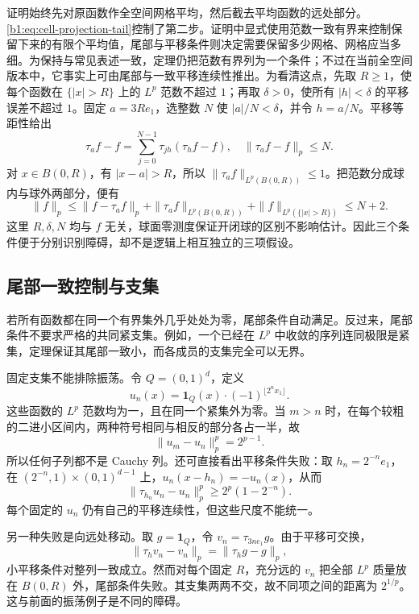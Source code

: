 证明始终先对原函数作全空间网格平均，然后截去平均函数的远处部分。\eqref{b1:eq:cell-projection-tail}控制了第二步。证明中显式使用范数一致有界来控制保留下来的有限个平均值，尾部与平移条件则决定需要保留多少网格、网格应当多细。为保持与常见表述一致，定理仍把范数有界列为一个条件；不过在当前全空间版本中，它事实上可由尾部与一致平移连续性推出。为看清这点，先取 \(R\ge1\)，使每个函数在 \(\{|x|>R\}\) 上的 \(L^p\) 范数不超过 \(1\)；再取 \(\delta>0\)，使所有 \(|h|<\delta\) 的平移误差不超过 \(1\)。固定 \(a=3Re_1\)，选整数 \(N\) 使 \(|a|/N<\delta\)，并令 \(h=a/N\)。平移等距性给出
\[
 \tau_af-f=\sum_{j=0}^{N-1}\tau_{jh}(\tau_hf-f),\quad
 \|\tau_af-f\|_p\le N.
\]
对 \(x\in B(0,R)\)，有 \(|x-a|>R\)，所以 \(\|\tau_af\|_{L^p(B(0,R))}\le1\)。把范数分成球内与球外两部分，便有
\[
 \|f\|_p\le\|f-\tau_af\|_p+\|\tau_af\|_{L^p(B(0,R))}
       +\|f\|_{L^p(\{|x|>R\})}\le N+2.
\]
这里 \(R,\delta,N\) 均与 \(f\) 无关，球面零测度保证开闭球的区别不影响估计。因此三个条件便于分别识别障碍，却不是逻辑上相互独立的三项假设。

\subsection{尾部一致控制与支集}
\label{b1:subsec:250103}

若所有函数都在同一个有界集外几乎处处为零，尾部条件自动满足。反过来，尾部条件不要求严格的共同紧支集。例如，一个已经在 \(L^p\) 中收敛的序列连同极限是紧集，定理保证其尾部一致小，而各成员的支集完全可以无界。

\ProseParagraphBreak

固定支集不能排除振荡。令 \(Q=(0,1)^d\)，定义
\[
 u_n(x)=\mathbf1_Q(x)\cdot(-1)^{\lfloor2^n x_1\rfloor}.
\]
这些函数的 \(L^p\) 范数均为一，且在同一个紧集外为零。当 \(m>n\) 时，在每个较粗的二进小区间内，两种符号相同与相反的部分各占一半，故
\[
 \|u_m-u_n\|_p^p=2^{p-1}.
\]
所以任何子列都不是 Cauchy 列。还可直接看出平移条件失败：取
\(h_n=2^{-n}e_1\)，在
\((2^{-n},1)\times(0,1)^{d-1}\) 上，\(u_n(x-h_n)=-u_n(x)\)，从而
\[
 \|\tau_{h_n}u_n-u_n\|_p^p
 \geq2^p(1-2^{-n}).
\]
每个固定的 \(u_n\) 仍有自己的平移连续性，但这些尺度不能统一。

\ProseParagraphBreak

另一种失败是向远处移动。取 \(g=\mathbf1_Q\)，令
\(v_n=\tau_{3ne_1}g\)。由于平移可交换，
\[
 \|\tau_hv_n-v_n\|_p=\|\tau_hg-g\|_p,
\]
小平移条件对整列一致成立。然而对每个固定 \(R\)，充分远的
\(v_n\) 把全部 \(L^p\) 质量放在 \(B(0,R)\) 外，尾部条件失败。其支集两两不交，故不同项之间的距离为 \(2^{1/p}\)。这与前面的振荡例子是不同的障碍。

